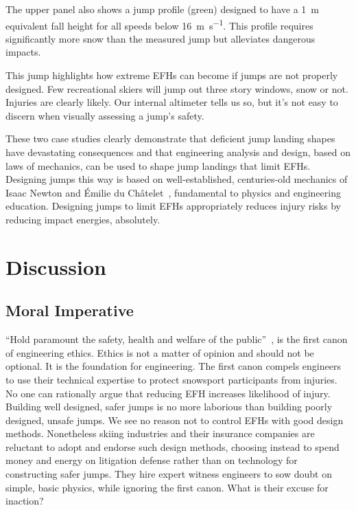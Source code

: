 \documentclass[smallextended]{svjour3}       %
\begin{document}
The upper panel also shows a jump profile (green) designed to have a
1~\si{\meter} equivalent fall height for all speeds below
16~\si{\meter\per\second}. This profile requires significantly more snow than
the measured jump but alleviates dangerous impacts.

This jump highlights how extreme EFHs can become if jumps are not properly
designed. Few recreational skiers will jump out three story windows, snow or
not. Injuries are clearly likely. Our internal altimeter tells us so, but it's
not easy to discern when visually assessing a jump's safety.

These two case studies clearly demonstrate that deficient jump landing shapes
have devastating consequences and that engineering analysis and design, based
on laws of mechanics, can be used to shape jump landings that limit EFHs.
Designing jumps this way is based on well-established, centuries-old mechanics
of Isaac Newton and Émilie du Châtelet~\cite{Zinsser2007}, fundamental to
physics and engineering education. Designing jumps to limit EFHs appropriately
reduces injury risks by reducing impact energies, absolutely.
\section{Discussion}
\subsection{Moral Imperative}
\label{sec:moral}
%
``Hold paramount the safety, health and welfare of the
public''~\cite{NSPE2019}, is the first canon of engineering ethics. Ethics is
not a matter of opinion and should not be optional. It is the foundation for
engineering. The first canon compels engineers to use their technical expertise
to protect snowsport participants from injuries. No one can rationally argue
that reducing EFH increases likelihood of injury. Building well designed, safer
jumps is no more laborious than building poorly designed, unsafe jumps. We see no reason not to control EFHs with good design methods. Nonetheless skiing
industries and their insurance companies are reluctant to adopt and endorse
such design methods, choosing instead to spend money and energy on litigation defense rather than on technology for constructing safer jumps. They hire expert witness engineers to sow doubt on simple, basic physics, while ignoring the first canon. What is their excuse for inaction?
\end{document}
